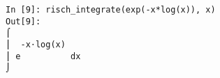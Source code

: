 ﻿\documentclass{article}
\begin{document}
\normalsize
\begin{Verbatim}
In [9]: risch_integrate(exp(-x*log(x)), x)
Out[9]: 
⌠              
⎮  -x⋅log(x)   
⎮ e          dx
⌡              
\end{Verbatim}
\end{document}

